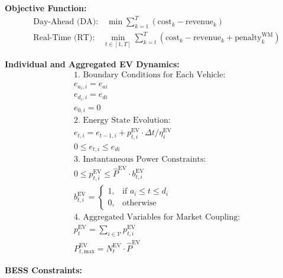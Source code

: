 \documentclass[conference]{IEEEtran}
\begin{document}
{\allowdisplaybreaks
\noindent \textbf{Objective Function:}
\begin{align}
    &\text{Day-Ahead (DA):} \quad \min \sum_{k=1}^{T} \left( \text{cost}_k - \text{revenue}_k \right) \nonumber \\
    &\text{Real-Time (RT):} \quad \min_{t \in [1, T]} \sum_{k=t}^{T} \left( \text{cost}_k - \text{revenue}_k + \text{penalty}_k^{\text{WM}} \right) \nonumber
\end{align}



\noindent \textbf{Individual and Aggregated EV Dynamics:} \\
\begin{align}
    & \text{1. Boundary Conditions for Each Vehicle:} \nonumber \\
    & e_{a_i,i} = e_{ai} \label{eq:ev_init} \\
    & e_{d_i,i} = e_{di} \label{eq:ev_end} \\
    & e_{0,i} = 0 \label{eq:ev_zero} \\
    & \text{2. Energy State Evolution:} \nonumber \\
    & e_{t,i} = e_{t-1,i} + p_{t,i}^{\text{EV}} \cdot \Delta t / \eta_i^{\text{EV}} \label{eq:ev_dynamics} \\
    & 0 \le e_{t,i} \le e_{di} \label{eq:ev_safety} \\
    & \text{3. Instantaneous Power Constraints:} \nonumber \\
    & 0 \le p_{t,i}^{\text{EV}} \le \hat{P}^{\text{EV}} \cdot b_{t,i}^{\text{EV}} \label{eq:ev_p_limit} \\
    & b_{t,i}^{\text{EV}} = \begin{cases} 1, & \text{if } a_i \le t \le d_i \\ 0, & \text{otherwise} \end{cases} \label{eq:gamma_def} \\
    & \text{4. Aggregated Variables for Market Coupling:} \nonumber \\
    & p_{t}^{\text{EV}} = \sum_{i \in \mathcal{V}} p_{t,i}^{\text{EV}} \label{eq:p_ev_total} \\
    & P_{t, \text{max}}^{\text{EV}} = N_t^{\text{EV}} \cdot \hat{P}^{\text{EV}} \label{eq:P_max_total}
\end{align}


\noindent \textbf{BESS Constraints:}

}
\end{document}
